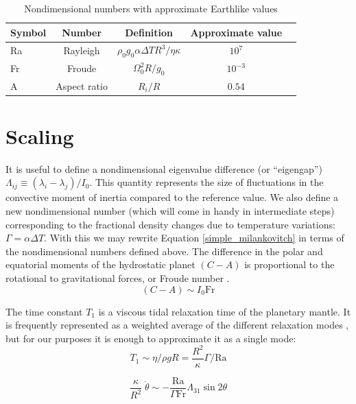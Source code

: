 \documentclass[extra,mreferee]{gji}
\begin{document}
\begin{table}
\centering
\caption{Nondimensional numbers with approximate Earthlike values}
\label{nondim}
\begin{tabular}{@{}lcccc}
Symbol &  Number & Definition & Approximate value \\
\hline
Ra & Rayleigh &  $\rho_0 g_0 \alpha \Delta T R^3/\eta \kappa$ & $10^7$\\
Fr & Froude & $\Omega_0^2 R/g_0$ & $10^{-3}$ \\
A & Aspect ratio & $R_i/R$ & $0.54$ \\
\end{tabular}
\end{table}
 
\section{Scaling}
\label{sec:scaling}

It is useful to define a nondimensional eigenvalue difference (or ``eigengap'') $\Lambda_{ij} \equiv (\lambda_i - \lambda_j)/I_0$.  
This quantity represents the size of fluctuations in the convective moment of inertia compared to the reference value.
We also define a new nondimensional number (which will come in handy in intermediate steps) corresponding to the fractional density changes due to temperature variations: $\Gamma = \alpha \Delta T$.
With this we may rewrite Equation \ref{simple_milankovitch} in terms of the nondimensional numbers defined above.
The difference in the polar and equatorial moments of the hydrostatic planet $(C-A)$ is proportional to the rotational to gravitational forces, or Froude number \citep[e.g.][]{??}.
\begin{equation}
(C-A) \sim I_0 \mathrm{Fr}
\end{equation}

The time constant $T_1$ is a viscous tidal relaxation time of the planetary mantle. It is frequently represented as a weighted average of the different relaxation modes \citep[e.g.][]{ricard1993polar, greff2004upwelling}, but for our purposes it is enough to approximate it as a single mode:
\begin{equation}
T_1 \sim \eta / \rho g R = \frac{R^2}{\kappa} \Gamma/\mathrm{Ra}
\end{equation}

\begin{equation}
\frac{\kappa}{R^2} \; \dot{\theta} \sim - \frac{\mathrm{Ra}}{\Gamma \mathrm{Fr}} \Lambda_{31} \sin{2 \theta}
\label{scaled_rotation}
\end{equation}
\end{document}
